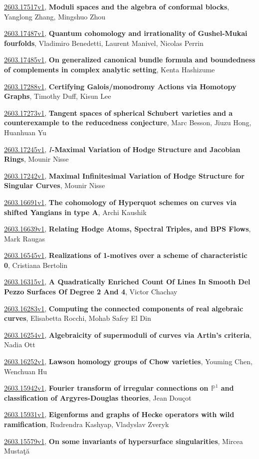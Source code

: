 \documentclass[9pt, a4paper]{article}
\theoremstyle{plain}
\theoremstyle{definition}
\theoremstyle{remark}
\newcommand{\arxiv}[3]{\href{https://arxiv.org/abs/#1}{#1}, \textbf{\textcolor{arxivblue}{#2}}, #3}
\begin{document}
\arxiv{2603.17517v1}{Moduli spaces and the algebra of conformal blocks}{Yanglong Zhang, Mingshuo Zhou}

\arxiv{2603.17487v1}{Quantum cohomology and irrationality of Gushel-Mukai fourfolds}{Vladimiro Benedetti, Laurent Manivel, Nicolas Perrin}

\arxiv{2603.17485v1}{On generalized canonical bundle formula and boundedness of complements in complex analytic setting}{Kenta Hashizume}

\arxiv{2603.17288v1}{Certifying Galois/monodromy Actions via Homotopy Graphs}{Timothy Duff, Kisun Lee}

\arxiv{2603.17273v1}{Tangent spaces of spherical Schubert varieties and a counterexample to the reducedness conjecture}{Marc Besson, Jiuzu Hong, Huanhuan Yu}

\arxiv{2603.17245v1}{$I$-Maximal Variation of Hodge Structure and Jacobian Rings}{Mounir Nisse}

\arxiv{2603.17242v1}{Maximal Infinitesimal Variation of Hodge Structure for Singular Curves}{Mounir Nisse}

\arxiv{2603.16691v1}{The cohomology of Hyperquot schemes on curves via shifted Yangians in type A}{Archi Kaushik}

\arxiv{2603.16639v1}{Relating Hodge Atoms, Spectral Triples, and BPS Flows}{Mark Raugas}

\arxiv{2603.16545v1}{Realizations of 1-motives over a scheme of characteristic 0}{Cristiana Bertolin}

\arxiv{2603.16315v1}{A Quadratically Enriched Count Of Lines In Smooth Del Pezzo Surfaces Of Degree 2 And 4}{Victor Chachay}

\arxiv{2603.16283v1}{Computing the connected components of real algebraic curves}{Elisabetta Rocchi, Mohab Safey El Din}

\arxiv{2603.16254v1}{Algebraicity of supermoduli of curves via Artin's criteria}{Nadia Ott}

\arxiv{2603.16252v1}{Lawson homology groups of Chow varieties}{Youming Chen, Wenchuan Hu}

\arxiv{2603.15942v1}{Fourier transform of irregular connections on $\mathbb P^1$ and classification of Argyres-Douglas theories}{Jean Douçot}

\arxiv{2603.15931v1}{Eigenforms and graphs of Hecke operators with wild ramification}{Rudrendra Kashyap, Vladyslav Zveryk}

\arxiv{2603.15579v1}{On some invariants of hypersurface singularities}{Mircea Mustaţă}
\end{document}
